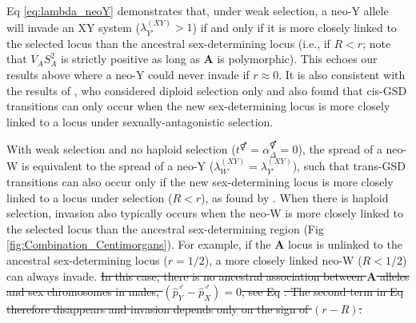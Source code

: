 \documentclass[10pt,letterpaper]{article}
\providecommand{\DIFaddtex}[1]{{\protect\color{blue}\uwave{#1}}} %
\providecommand{\DIFdeltex}[1]{{\protect\color{red}\sout{#1}}}                      %
\providecommand{\DIFaddbegin}{} %
\providecommand{\DIFaddend}{} %
\providecommand{\DIFdelbegin}{} %
\providecommand{\DIFdelend}{} %
\providecommand{\DIFadd}[1]{\texorpdfstring{\DIFaddtex{#1}}{#1}} %
\providecommand{\DIFdel}[1]{\texorpdfstring{\DIFdeltex{#1}}{}} %
\begin{document}
Eq \eqref{eq:lambda_neoY} demonstrates that, under weak selection, a neo-Y allele will invade an XY system ($\lambda_{Y'}^{(XY)}>1$) if and only if it is more closely linked to the selected locus than the ancestral sex-determining locus (i.e., if $R<r$; note that $V_{A}S_{A}^2$ is strictly positive as long as $\mathbf{A}$ is polymorphic). 
This echoes our results above where a neo-Y could never invade if $r\approx0$. 
It is also consistent with the results of \cite{vanDoorn:2007eu}, who considered diploid selection only and also found that cis-GSD transitions can only occur when the new sex-determining locus is more closely linked to a locus under sexually-antagonistic selection. 

With weak selection and no haploid selection (\DIFdelbegin \DIFdel{$t^\Hermaphrodite=\alpha^\Hermaphrodite_{\Delta}=0$}\DIFdelend \DIFaddbegin \DIFadd{$t^\circ=\alpha^\circ_{\Delta}=0$}\DIFaddend ), the spread of a neo-W is equivalent to the spread of a neo-Y ($\lambda_{W'}^{(XY)}=\lambda_{Y'}^{(XY)}$), such that trans-GSD transitions can also occur only if the new sex-determining locus is more closely linked to a locus under selection ($R<r$), as found by \cite{vanDoorn:2010hu}. 
When there is haploid selection, invasion also typically occurs when the neo-W is more closely linked to the selected locus than the ancestral sex-determining region (Fig \ref{fig:Combination_Centimorgans}).
For example, if the $\mathbf{A}$ locus is unlinked to the ancestral sex-determining locus ($r=1/2$\DIFaddbegin \DIFadd{, which implies that $ \hat{p}^\male_Y-\hat{p}^\male_X =0$}\DIFaddend ), a more closely linked neo-W ($R<1/2$) can always invade. 
\DIFdelbegin \DIFdel{In this case, there is no ancestral association between $\mathbf{A}$ alleles and sex chromosomes in males, $\left( \hat{p}^\male_Y-\hat{p}^\male_X \right)=0$, see Eq }%
\DIFdel{. 
The second term in Eq }%
\DIFdel{therefore disappears and invasion depends only on the sign of $(r-R)$.%
}%
\end{document}
